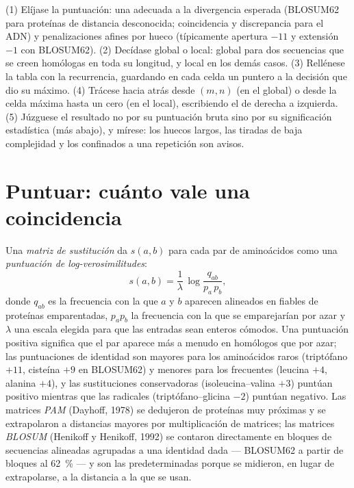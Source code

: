 \begin{method}\label{met:b3:bioinformatics:align}
(1) Elíjase la puntuación: una  adecuada a la
divergencia esperada (BLOSUM62 para proteínas de distancia desconocida;
coincidencia y discrepancia para el ADN) y penalizaciones afines por
hueco (típicamente apertura $-11$ y extensión $-1$ con BLOSUM62).
(2) Decídase global o local: global para dos secuencias que se creen
homólogas en toda su longitud, y local en los demás casos. (3) Rellénese
la tabla con la recurrencia, guardando en cada celda un puntero a la
decisión que dio su máximo. (4) Trácese hacia atrás desde $(m,n)$ (en el
global) o desde la celda máxima hasta un cero (en el local), escribiendo
el  de derecha a izquierda. (5) Júzguese el resultado no por
su puntuación bruta sino por su significación estadística (más abajo), y
mírese: los huecos largos, las tiradas de baja complejidad y los
 confinados a una repetición son avisos.
\end{method}

\section{Puntuar: cuánto vale una coincidencia}

\begin{definition}\label{def:b3:bioinformatics:matrices}
Una \emph{matriz de sustitución} da $s(a,b)$ para cada par de
aminoácidos como una \emph{puntuación de log-verosimilitudes}:
\[
s(a,b) = \frac{1}{\lambda}\,\log\frac{q_{ab}}{p_{a}\,p_{b}},
\]
donde $q_{ab}$ es la frecuencia con la que $a$ y $b$ aparecen alineados
en  fiables de proteínas emparentadas, $p_{a} p_{b}$ la
frecuencia con la que se emparejarían por azar y $\lambda$ una escala
elegida para que las entradas sean enteros cómodos. Una puntuación
positiva significa que el par aparece más a menudo en homólogos que por
azar; las puntuaciones de identidad son mayores para los aminoácidos
raros (triptófano $+11$, cisteína $+9$ en BLOSUM62) y menores para los
frecuentes (leucina $+4$, alanina $+4$), y las sustituciones
conservadoras (isoleucina--valina $+3$) puntúan positivo mientras que las
radicales (triptófano--glicina $-2$) puntúan negativo. Las matrices
\emph{PAM} (Dayhoff, 1978) se dedujeron de proteínas muy próximas y se
extrapolaron a distancias mayores por multiplicación de matrices; las
matrices \emph{BLOSUM} (Henikoff y Henikoff, 1992) se contaron
directamente en bloques de secuencias alineadas agrupadas a una identidad
dada --- BLOSUM62 a partir de bloques al \qty{62}{\%} --- y son las
predeterminadas porque se midieron, en lugar de extrapolarse, a la
distancia a la que se usan.
\end{definition}

